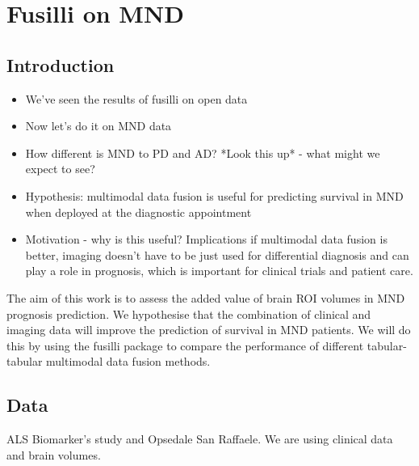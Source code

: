 \chapter{Fusilli on MND}
\label{fusilli_on_mnd}

\section{Introduction}
\begin{itemize}
    \item We've seen the results of fusilli on open data
    \item Now let's do it on MND data
    \item How different is MND to PD and AD? *Look this up* - what might we expect to see?
    \item Hypothesis: multimodal data fusion is useful for predicting survival in MND when deployed at the diagnostic appointment
    \item Motivation - why is this useful? Implications if multimodal data fusion is better, imaging doesn't have to be just used for differential diagnosis and can play a role in prognosis, which is important for clinical trials and patient care.
\end{itemize}

The aim of this work is to assess the added value of brain ROI volumes in MND prognosis prediction.
We hypothesise that the combination of clinical and imaging data will improve the prediction of survival in MND patients.
We will do this by using the fusilli package to compare the performance of different tabular-tabular multimodal data fusion methods.

\section{Data}

ALS Biomarker's study and Opsedale San Raffaele.
We are using clinical data and brain volumes.



